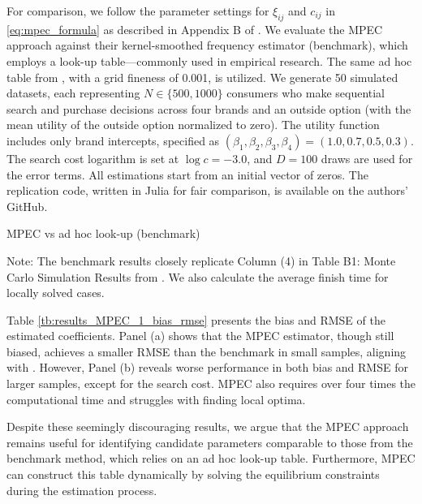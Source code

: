 \documentclass[12pt]{article}
\begin{document}
For comparison, we follow the parameter settings for \(\xi_{ij}\) and \(c_{ij}\) in \eqref{eq:mpec_formula} as described in Appendix B of \cite{ursu2023sequential}. We evaluate the MPEC approach against their kernel-smoothed frequency estimator (benchmark), which employs a look-up table—commonly used in empirical research. The same ad hoc table from \cite{ursu2023sequential}, with a grid fineness of 0.001, is utilized.
We generate 50 simulated datasets, each representing \(N\in\{500,1000\}\) consumers who make sequential search and purchase decisions across four brands and an outside option (with the mean utility of the outside option normalized to zero). The utility function includes only brand intercepts, specified as \((\beta_1,\beta_2,\beta_3,\beta_4) = (1.0, 0.7, 0.5, 0.3)\). The search cost logarithm is set at \(\log c = -3.0\), and \(D = 100\) draws are used for the error terms. All estimations start from an initial vector of zeros. The replication code, written in Julia for fair comparison, is available on the authors' GitHub.


\begin{table}[!htbp]
  \begin{center}
      \caption{MPEC vs ad hoc look-up (benchmark)}
      \label{tb:results_MPEC_1_bias_rmse} 
      \subfloat[$N=500$]{}
      \subfloat[$N=1000$]{}
  \end{center}
  \footnotesize
  Note: The benchmark results closely replicate Column (4) in Table B1: Monte Carlo Simulation Results from \cite{ursu2023sequential}. We also calculate the average finish time for locally solved cases.
\end{table} 

Table \ref{tb:results_MPEC_1_bias_rmse} presents the bias and RMSE of the estimated coefficients. Panel (a) shows that the MPEC estimator, though still biased, achieves a smaller RMSE than the benchmark in small samples, aligning with \cite{lu2014mpec}. However, Panel (b) reveals worse performance in both bias and RMSE for larger samples, except for the search cost. MPEC also requires over four times the computational time and struggles with finding local optima.

Despite these seemingly discouraging results, we argue that the MPEC approach remains useful for identifying candidate parameters comparable to those from the benchmark method, which relies on an ad hoc look-up table. Furthermore, MPEC can construct this table dynamically by solving the equilibrium constraints during the estimation process.
\end{document}
